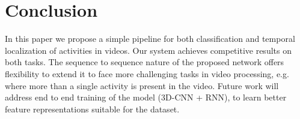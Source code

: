 \documentclass{article}
\begin{document}

\section{Conclusion}

In this paper we propose a simple pipeline for both classification and temporal localization of activities in videos. Our system achieves competitive results on both tasks. The sequence to sequence nature of the proposed network offers flexibility to extend it to face more challenging tasks in video processing, e.g. where more than a single activity is present in the video. Future work will address end to end training of the model (3D-CNN + RNN), to learn better feature representations suitable for the dataset.



\section*{}
{\small


}
\end{document}
